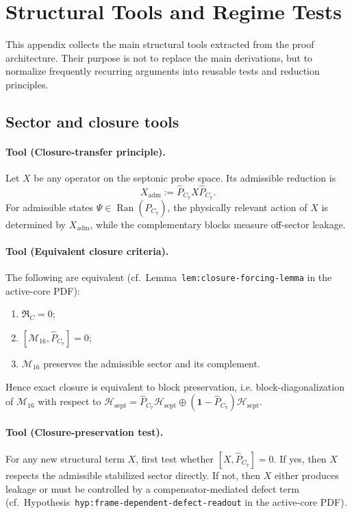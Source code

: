 \section{Structural Tools and Regime Tests}
\label{app:structural-tools-regime-tests}

This appendix collects the main structural tools extracted from the
proof architecture. Their purpose is not to replace the main
derivations, but to normalize frequently recurring arguments into
reusable tests and reduction principles.

\subsection*{Sector and closure tools}

\paragraph{Tool (Closure-transfer principle).}
Let $X$ be any operator on the septonic probe space. Its admissible
reduction is
\[
  X_{\mathrm{adm}} := \hat{P}_{C_7} X \hat{P}_{C_7}.
\]
For admissible states $\Psi \in \operatorname{Ran}(\hat{P}_{C_7})$, the
physically relevant action of $X$ is determined by $X_{\mathrm{adm}}$,
while the complementary blocks measure off-sector leakage.

\paragraph{Tool (Equivalent closure criteria).}
The following are equivalent
(cf.\ Lemma~\texttt{lem:closure-forcing-lemma} in the active-core PDF):
\begin{enumerate}[label=(\roman*)]
  \item $\mathfrak{R}_C = 0$;
  \item $[\mathcal{M}_{16}, \hat{P}_{C_7}] = 0$;
  \item $\mathcal{M}_{16}$ preserves the admissible sector and its complement.
\end{enumerate}
Hence exact closure is equivalent to block preservation, i.e. block-diagonalization of $\mathcal{M}_{16}$ with respect to
$\mathcal{H}_{\mathrm{sept}} = \hat{P}_{C_7}\mathcal{H}_{\mathrm{sept}}
\oplus (\mathbf{1} - \hat{P}_{C_7})\mathcal{H}_{\mathrm{sept}}$.

\paragraph{Tool (Closure-preservation test).}
For any new structural term $X$, first test whether
$[X, \hat{P}_{C_7}] = 0$.
If yes, then $X$ respects the admissible stabilized sector directly.
If not, then $X$ either produces leakage or must be controlled by a
compensator-mediated defect term
(cf.\ Hypothesis~\texttt{hyp:frame-dependent-defect-readout} in the active-core PDF).

